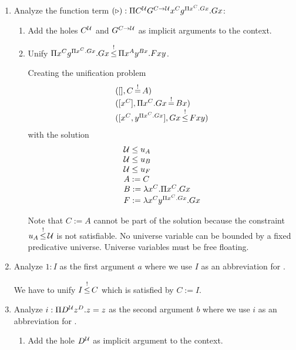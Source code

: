 \begin{enumerate}

\item Analyze the function term $(\triangleright): \Pi C^{\cal{U}} G^{C\to{\cal{U}}} x^C
g^{\Pi x^C.Gx}. Gx$:

    \begin{enumerate} \item Add the holes $C^{\cal{U}}$ and $G^{C\to{\cal{U}}}$ as
    implicit arguments to the context.

    \item Unify $\Pi x^C g^{\Pi x^C.Gx}. Gx {\,\stackrel{!}{\le}\,} \Pi x^A y^{Bx}. F x y $.

    Creating the unification problem
    $$
    \begin{array}{l}
        ([], C {\,\stackrel{!}{=}\,} A)
        \\
        ([x^C], \Pi x^C . G x {\,\stackrel{!}{=}\,} B x)
        \\
        ([x^C, y^{\Pi x^C.G x}], G x {\,\stackrel{!}{\le}\,} F x y)
    \end{array}
    $$
    with the solution
    $$
    \begin{array}{l}
        {\cal{U}} \le u_A
        \\
        {\cal{U}} \le u_B
        \\
        {\cal{U}} \le u_F
        \\
        A := C
        \\
        B := \lambda x^C . \Pi x^C. G x
        \\
        F := \lambda x^C y^{\Pi x^C.Gx} . G x
    \end{array}
    $$

    Note that $ C := A$ cannot be part of the solution because the constraint
    $u_A {\,\stackrel{!}{\le}\,} {\cal{U}}$ is not satisfiable. No universe variable can be bounded
    by a fixed predicative universe. Universe variables must be free floating.

    \end{enumerate}

\item Analyze $1: I$ as the first argument $a$ where we use $I$ as an
abbreviation for .

We have to unify $ I {\,\stackrel{!}{\le}\,} C$ which is satisfied by $C := I$.


\item Analyze $i: \Pi D^{\cal{U}} z^D. z = z$ as the second argument $b$ where we use
$i$ as an abbreviation for .

    \begin{enumerate}
    \item Add the hole $D^{\cal{U}}$ as implicit argument to the context.


\end{enumerate}
\end{enumerate}
